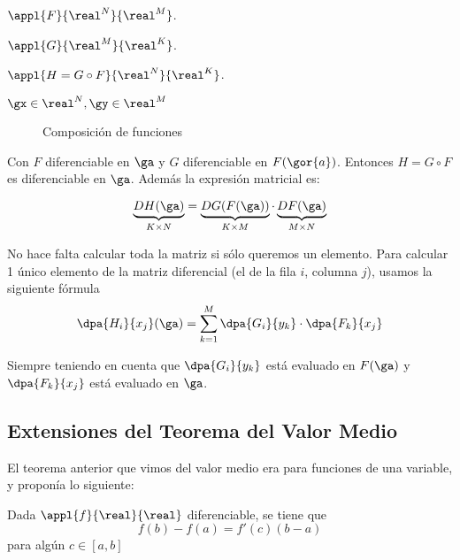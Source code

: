$\appl{F}{\real^N}{\real^M}$.

$\appl{G}{\real^M}{\real^K}$.

$\appl{H=G\circ F}{\real^N}{\real^K}$.

$ \gx \in \real^N, \gy \in \real^M$

\begin{wrapfigure}{r}{0.3\textwidth}
\begin{center}
\end{center}
\caption{Composición de funciones}
\end{wrapfigure}

Con $F$ diferenciable en $\ga$ y $G$ diferenciable en $F(\gor{a})$. Entonces $H=G\circ F$ es diferenciable en $\ga $.
Además la expresión matricial es:

\[ \underbrace{DH(\ga)}_{K\times N} = \underbrace{DG(F(\ga))}_{K\times M}\cdot \underbrace{DF(\ga)}_{M\times N} \]

No hace falta calcular toda la matriz si sólo queremos un elemento. Para calcular 1 único elemento de la matriz diferencial (el de la fila $i$, columna $j$), usamos la siguiente fórmula
\[ \dpa{H_i}{x_j}(\ga) = \sum_{k=1}^M \dpa{G_i}{y_k}\cdot\dpa{F_k}{x_j} \]

Siempre teniendo en cuenta que $\displaystyle\dpa{G_i}{y_k}$ está evaluado en $F(\ga)$ y $\displaystyle\dpa{F_k}{x_j}$ está evaluado en $\ga$.

\subsection{Extensiones del Teorema del Valor Medio}

El teorema anterior que vimos del valor medio era para funciones de una variable, y proponía lo siguiente:
\begin{theorem}
\label{thmTVM1var}
Dada $\appl{f}{\real}{\real}$ diferenciable, se tiene que \[ f(b)-f(a) = f'(c)(b-a)\] para algún $c\in[a,b]$
\end{theorem}

